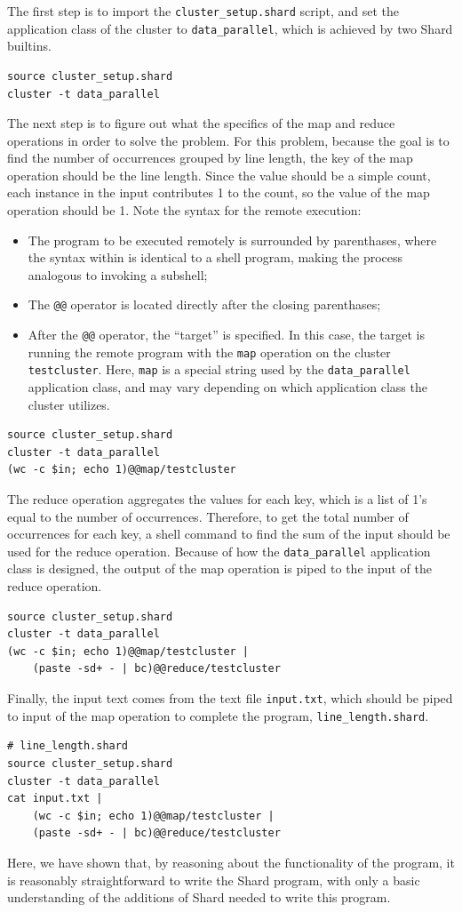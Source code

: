 \documentclass[twoside]{report}
\begin{document}
The first step is to import the \texttt{cluster\_setup.shard} script, and set the application class of the cluster to \texttt{data\_parallel}, which is achieved by two Shard builtins.
\begin{lstlisting}[language=Shard]
source cluster_setup.shard
cluster -t data_parallel
\end{lstlisting}
The next step is to figure out what the specifics of the map and reduce operations in order to solve the problem.
For this problem, because the goal is to find the number of occurrences grouped by line length, the key of the map operation should be the line length.
Since the value should be a simple count, each instance in the input contributes 1 to the count, so the value of the map operation should be 1.
Note the syntax for the remote execution:
\begin{itemize}
  \item The program to be executed remotely is surrounded by parenthases, where the syntax within is identical to a shell program, making the process analogous to invoking a subshell;
  \item The \texttt{@@} operator is located directly after the closing parenthases;
  \item After the \texttt{@@} operator, the ``target'' is specified. In this case, the target is running the remote program with the \texttt{map} operation on the cluster \texttt{testcluster}. Here, \texttt{map} is a special string used by the \texttt{data\_parallel} application class, and may vary depending on which application class the cluster utilizes.
\end{itemize}
\begin{lstlisting}[language=Shard]
source cluster_setup.shard
cluster -t data_parallel
(wc -c $in; echo 1)@@map/testcluster
\end{lstlisting}
The reduce operation aggregates the values for each key, which is a list of 1's equal to the number of occurrences.
Therefore, to get the total number of occurrences for each key, a shell command to find the sum of the input should be used for the reduce operation.
Because of how the \texttt{data\_parallel} application class is designed, the output of the map operation is piped to the input of the reduce operation.
\begin{lstlisting}[language=Shard]
source cluster_setup.shard
cluster -t data_parallel
(wc -c $in; echo 1)@@map/testcluster |
    (paste -sd+ - | bc)@@reduce/testcluster
\end{lstlisting}
Finally, the input text comes from the text file \texttt{input.txt}, which should be piped to input of the map operation to complete the program, \texttt{line\_length.shard}.
\begin{lstlisting}[language=Shard]
# line_length.shard
source cluster_setup.shard
cluster -t data_parallel
cat input.txt |
    (wc -c $in; echo 1)@@map/testcluster |
    (paste -sd+ - | bc)@@reduce/testcluster
\end{lstlisting}
Here, we have shown that, by reasoning about the functionality of the program, it is reasonably straightforward to write the Shard program, with only a basic understanding of the additions of Shard needed to write this program.
\end{document}
